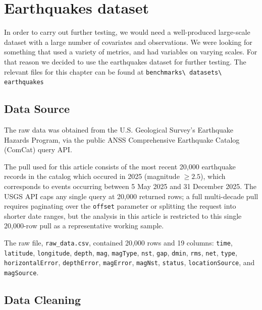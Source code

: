 \documentclass[11pt,twoside,a4paper]{article}
\begin{document}
\section{Earthquakes dataset}
In order to carry out further testing, we would need a well-produced large-scale dataset with a large number of covariates and observations. We were looking for something that used a variety of metrics, and had variables on varying scales. For that reason we decided to use the earthquakes dataset for further testing. The relevant files for this chapter can be found at \nolinkurl{benchmarks\ datasets\ earthquakes}\cite{repo}

\subsection{Data Source}

The raw data was obtained from the U.S. Geological Survey's Earthquake Hazards
Program, via the public ANSS Comprehensive Earthquake Catalog (ComCat) query API\cite{earthquakes-api}.

The pull used for this article consists of the most recent 20{,}000 earthquake
records in the catalog which occured in 2025 (magnitude $\geq 2.5$), which
corresponds to events occurring between 5 May 2025 and 31 December 2025. The USGS
API caps any single query at 20{,}000 returned rows; a full multi-decade pull
requires paginating over the \texttt{offset} parameter or splitting the request
into shorter date ranges, but the analysis in this article is restricted to this
single 20{,}000-row pull as a representative working sample.

The raw file, \texttt{raw\_data.csv}\cite{repo}, contained 20{,}000 rows and 19 columns:
\texttt{time}, \texttt{latitude}, \texttt{longitude}, \texttt{depth}, \texttt{mag},
\texttt{magType}, \texttt{nst}, \texttt{gap}, \texttt{dmin}, \texttt{rms},
\texttt{net}, \texttt{type}, \texttt{horizontalError}, \texttt{depthError},
\texttt{magError}, \texttt{magNst}, \texttt{status}, \texttt{locationSource}, and
\texttt{magSource}.

\subsection{Data Cleaning}
\end{document}
